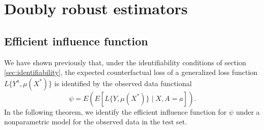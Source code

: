 

\section{Doubly robust estimators} \label{sec:dr}

\subsection{Efficient influence function}
We have shown previously that, under the identifiability conditions of section \ref{sec:identifiability}, the expected counterfactual loss of a generalized loss function $L\{Y^a, \mu(X^*)\}$ is identified by the observed data functional
\begin{equation*}\label{eqn:cl_estimand}
    \psi = E\left(E[L\{Y, \mu(X^*)\} \mid X, A=a] \right).
\end{equation*}
In the following theorem, we identify the efficient influence function for $\psi$ under a nonparametric model for the observed data in the test set. 

